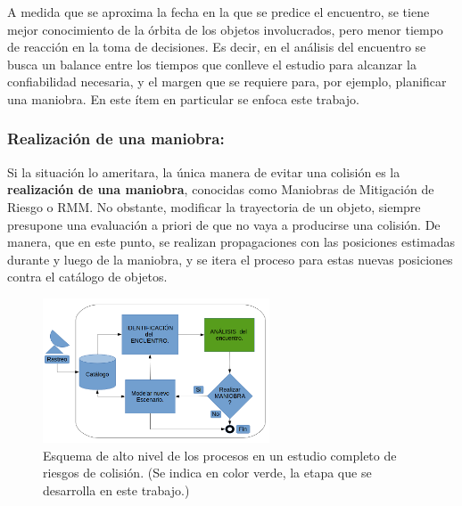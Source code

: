 A medida que se aproxima la fecha en la que se predice el encuentro, se tiene mejor conocimiento de la \'orbita de los objetos involucrados, pero menor tiempo de reacci\'on en la toma de decisiones. Es decir, en el an\'alisis del encuentro se busca un balance entre los tiempos que conlleve el estudio para alcanzar la confiabilidad necesaria, y el margen que se requiere para, por ejemplo, planificar una maniobra. En este \'item en particular se enfoca este trabajo.\\

\subsubsection*{Realizaci\'on de una maniobra:}
Si la situaci\'on lo ameritara, la \'unica manera de evitar una colisi\'on es la {\bf{realizaci\'on de una maniobra}}, conocidas como Maniobras de Mitigaci\'on de Riesgo o \ac{RMM}. No obstante, modificar la trayectoria de un objeto, siempre presupone una evaluaci\'on a priori de que no vaya a producirse una colisi\'on. De manera, que en este punto, se realizan propagaciones con las posiciones estimadas durante y luego de la maniobra, y se itera el proceso para estas nuevas posiciones contra el cat\'alogo de objetos.\\ 



\begin{figure}[!h]
  \centering
  \includegraphics[width=0.6\textwidth]{imagenes/estudiocolision}
  \caption[Estudio de Colisi\'on]{Esquema de alto nivel de los procesos en un estudio completo de riesgos de colisi\'on. (Se indica en color verde, la etapa que se desarrolla en este trabajo.)}
  \label{fig:estudiocolision}
\end{figure}


